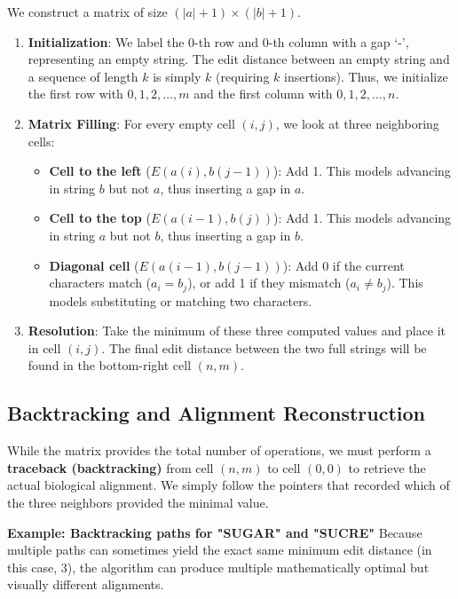 \documentclass[11pt,a4paper]{article}
\begin{document}
We construct a matrix of size \((|a|+1) \times (|b|+1)\). 
\begin{enumerate}
    \item \textbf{Initialization}: We label the 0-th row and 0-th column with a gap `-', representing an empty string. The edit distance between an empty string and a sequence of length \(k\) is simply \(k\) (requiring \(k\) insertions). Thus, we initialize the first row with \(0, 1, 2, \dots, m\) and the first column with \(0, 1, 2, \dots, n\).
    \item \textbf{Matrix Filling}: For every empty cell \((i, j)\), we look at three neighboring cells:
    \begin{itemize}
        \item \textbf{Cell to the left} (\(E(a(i), b(j-1))\)): Add 1. This models advancing in string \(b\) but not \(a\), thus inserting a gap in \(a\).
        \item \textbf{Cell to the top} (\(E(a(i-1), b(j))\)): Add 1. This models advancing in string \(a\) but not \(b\), thus inserting a gap in \(b\).
        \item \textbf{Diagonal cell} (\(E(a(i-1), b(j-1))\)): Add 0 if the current characters match (\(a_i = b_j\)), or add 1 if they mismatch (\(a_i \neq b_j\)). This models substituting or matching two characters.
    \end{itemize}
    \item \textbf{Resolution}: Take the minimum of these three computed values and place it in cell \((i, j)\). The final edit distance between the two full strings will be found in the bottom-right cell \((n, m)\).
\end{enumerate}

\subsection{Backtracking and Alignment Reconstruction}

While the matrix provides the total number of operations, we must perform a \textbf{traceback (backtracking)} from cell \((n, m)\) to cell \((0, 0)\) to retrieve the actual biological alignment. We simply follow the pointers that recorded which of the three neighbors provided the minimal value.

\textbf{Example: Backtracking paths for "SUGAR" and "SUCRE"}
Because multiple paths can sometimes yield the exact same minimum edit distance (in this case, 3), the algorithm can produce multiple mathematically optimal but visually different alignments.
\end{document}
